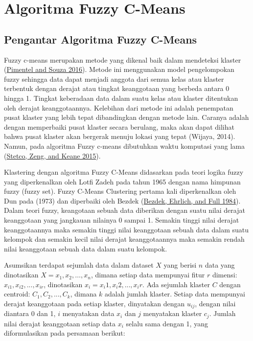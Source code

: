 \documentclass[
]{elegantbook}
\begin{document}
\hypertarget{algoritma-fuzzy-c-means}{%
\chapter{Algoritma Fuzzy C-Means}\label{algoritma-fuzzy-c-means}}

\hypertarget{pengantar-algoritma-fuzzy-c-means}{%
\section{Pengantar Algoritma Fuzzy C-Means}\label{pengantar-algoritma-fuzzy-c-means}}

Fuzzy c-means merupakan metode yang dikenal baik dalam mendeteksi klaster (\protect\hyperlink{ref-pimentel2016}{Pimentel and Souza 2016}). Metode ini menggunakan model pengelompokan fuzzy sehingga data dapat menjadi anggota dari semua kelas atau klaster terbentuk dengan derajat atau tingkat keanggotaan yang berbeda antara 0 hingga 1. Tingkat keberadaan data dalam suatu kelas atau klaster ditentukan oleh derajat keanggotaannya. Kelebihan dari metode ini adalah penempatan pusat klaster yang lebih tepat dibandingkan dengan metode lain. Caranya adalah dengan memperbaiki pusat klaster secara berulang, maka akan dapat dilihat bahwa pusat klaster akan bergerak menuju lokasi yang tepat (Wijaya, 2014). Namun, pada algoritma Fuzzy c-means dibutuhkan waktu komputasi yang lama (\protect\hyperlink{ref-stetco2015}{Stetco, Zeng, and Keane 2015}).

Klastering dengan algoritma Fuzzy C-Means didasarkan pada teori logika fuzzy yang diperkenalkan oleh Lotfi Zadeh pada tahun 1965 dengan nama himpunan fuzzy (fuzzy set). Fuzzy C-Means Clustering pertama kali diperkenalkan oleh Dun pada (1973) dan diperbaiki oleh Bezdek (\protect\hyperlink{ref-bezdek1984}{Bezdek, Ehrlich, and Full 1984}). Dalam teori fuzzy, keangotaan sebuah data diberikan dengan suatu nilai derajat keanggotaan yang jangkauan nilainya 0 sampai 1. Semakin tinggi nilai derajat keanggotaannya maka semakin tinggi nilai keanggotaan sebuah data dalam suatu kelompok dan semakin kecil nilai derajat keanggotaannya maka semakin rendah nilai keanggotaan sebuah data dalam suatu kelompok.

Asumsikan terdapat sejumlah data dalam dataset \(X\) yang berisi \(n\) data yang dinotasikan \(X={x_1,x_2, …,x_n}\), dimana setiap data mempunyai fitur \(r\) dimensi: \(x_{i1}, x_{i2}, ..., x_{ir}\), dinotasikan \(x_i={x_i1, x_i2, ..., x_ir}\). Ada sejumlah klaster \(C\) dengan centroid: \(C_1, C_2, ..., C_k\), dimana \(k\) adalah jumlah klaster. Setiap data mempunyai derajat keanggotaan pada setiap klaster, dinyatakan dengan \(u_{ij}\), dengan nilai diantara 0 dan 1, \(i\) menyatakan data \(x_i\) dan \(j\) menyatakan klaster \(c_j\). Jumlah nilai derajat keanggotaan setiap data \(x_i\) selalu sama dengan 1, yang diformulasikan pada persamaan berikut:
\end{document}
